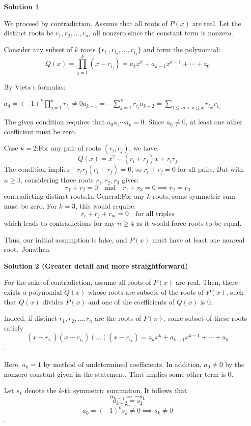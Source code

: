 \begin{enumerate}
 



\textbf{Solution 1}

We proceed by contradiction. Assume that all roots of $P(x)$ are real. Let the distinct roots be $r_1, r_2, \ldots, r_n$, all nonzero since the constant term is nonzero.

 Consider any subset of $k$ roots $\{r_{i_1}, r_{i_2}, \ldots, r_{i_k}\}$ and form the polynomial:
 \[Q(x) = \prod_{j=1}^k (x - r_{i_j}) =a_{k} x^k + a_{k-1}x^{k-1} + \cdots + a_0\]

 By Vieta's formulas:

 $a_0 = (-1)^k \prod_{j=1}^k r_{i_j} \neq 0$$a_{k-1} = -\sum_{j=1}^k r_{i_j}$$a_{k-2} = \sum_{1\leq m<n\leq k} r_{i_m}r_{i_n}$

 
The given condition requires that $a_0a_1\cdots a_k = 0$. Since $a_0 \neq 0$, at least one other coefficient must be zero.

 Case $k=2$:For any pair of roots $(r_i, r_j)$, we have:
 \[Q(x) = x^2 - (r_i+r_j)x + r_ir_j\]The condition implies $-r_ir_j(r_i+r_j) = 0$, so $r_i + r_j = 0$ for all pairs. But with $n \geq 3$, considering three roots $r_1, r_2, r_3$ gives:
 \[r_1 + r_2 = 0 \quad \text{and} \quad r_1 + r_3 = 0 \implies r_2 = r_3\]contradicting distinct roots.In General:For any $k$ roots, some symmetric sum must be zero. For $k=3$, this would require:
 \[r_i + r_j + r_m = 0 \quad \text{for all triples}\]which leads to contradictions for any $n \geq 4$ as it would force roots to be equal.

 Thus, our initial assumption is false, and $P(x)$ must have at least one nonreal root.~Jonathan

 



\textbf{Solution 2 (Greater detail and more straightforward)}

For the sake of contradiction, assume all roots of $P(x)$ are real. Then, there exists a polynomial $Q(x)$ whose roots are subsets of the roots of $P(x)$, such that $Q(x)$ divides $P(x)$ and one of the coefficients of $Q(x)$ is 0.

 Indeed, if distinct $r_1, r_2, \dots, r_n$ are the roots of $P(x)$, some subset of these roots satisfy
 \[(x-r_{i_1})(x- r_{i_2})(\dots)(x-r_{i_k}) = a_{k} x^k + a_{k-1}x^{k-1} + \cdots + a_0\].

 Here, $a_k = 1$ by method of undetermined coefficients. In addition, $a_0 \neq 0$ by the nonzero constant given in the statement. That implies some other term is 0.

 Let $s_k$ denote the $k$-th symmetric summation. It follows that 
 \[a_{k-1} = -s_1\]
 \[a_{k-2} = s_2\]
 \[\dots\]
 \[a_0 = (-1)^k s_k \neq 0 \implies s_k \neq 0\].


\end{enumerate}
